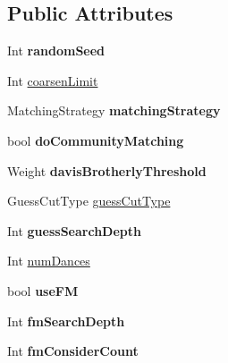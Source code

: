 \subsection*{Public Attributes}
\begin{DoxyCompactItemize}
\item 
\hypertarget{struct_mongoose_1_1_options_aac70ef8acf62bf396cd93b431b102196}{}\label{struct_mongoose_1_1_options_aac70ef8acf62bf396cd93b431b102196} 
Int {\bfseries random\+Seed}
\item 
Int \hyperlink{struct_mongoose_1_1_options_a240d271ff083f6d841cf8f3ea626dd5a}{coarsen\+Limit}
\item 
\hypertarget{struct_mongoose_1_1_options_a1959e5fe45fe5c34ad08359c8105c96d}{}\label{struct_mongoose_1_1_options_a1959e5fe45fe5c34ad08359c8105c96d} 
Matching\+Strategy {\bfseries matching\+Strategy}
\item 
\hypertarget{struct_mongoose_1_1_options_a02849b1dddc8735241a71e09244f5a00}{}\label{struct_mongoose_1_1_options_a02849b1dddc8735241a71e09244f5a00} 
bool {\bfseries do\+Community\+Matching}
\item 
\hypertarget{struct_mongoose_1_1_options_a16ea5b012fafe024da8ea88b780e78a0}{}\label{struct_mongoose_1_1_options_a16ea5b012fafe024da8ea88b780e78a0} 
Weight {\bfseries davis\+Brotherly\+Threshold}
\item 
Guess\+Cut\+Type \hyperlink{struct_mongoose_1_1_options_a31abd6eab9505fb7d3964e314f75b18c}{guess\+Cut\+Type}
\item 
\hypertarget{struct_mongoose_1_1_options_a184d587408236524832734a816a45a4c}{}\label{struct_mongoose_1_1_options_a184d587408236524832734a816a45a4c} 
Int {\bfseries guess\+Search\+Depth}
\item 
Int \hyperlink{struct_mongoose_1_1_options_ab1d4fb2e1c43f58fd0e3b0af718cc47e}{num\+Dances}
\item 
\hypertarget{struct_mongoose_1_1_options_a1a2b9641093bd7056488f562bdc5f1f8}{}\label{struct_mongoose_1_1_options_a1a2b9641093bd7056488f562bdc5f1f8} 
bool {\bfseries use\+FM}
\item 
\hypertarget{struct_mongoose_1_1_options_aa5bab04892ff8acdb61c3481c0265422}{}\label{struct_mongoose_1_1_options_aa5bab04892ff8acdb61c3481c0265422} 
Int {\bfseries fm\+Search\+Depth}
\item 
\hypertarget{struct_mongoose_1_1_options_a6ab7aa097ec7e19639c41b5b591d5f9e}{}\label{struct_mongoose_1_1_options_a6ab7aa097ec7e19639c41b5b591d5f9e} 
Int {\bfseries fm\+Consider\+Count}
\item 

\end{DoxyCompactItemize}
